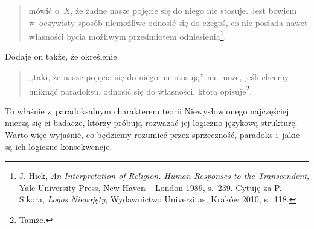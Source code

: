 \begin{quote}
mówić o~$X$, że żadne nasze pojęcie się do niego nie stosuje. Jest bowiem w~oczywisty sposób niemożliwe odnosić się do czegoś, co nie posiada nawet własności bycia możliwym przedmiotem odniesienia\footnote{J. Hick, \textit{An Interpretation of Religion. Human Responses to the Transcendent}, Yale University Press, New Haven -- London 1989, s.~239. Cytuję za P. Sikora, \textit{Logos Niepojęty}, Wydawnictwo Universitas, Kraków 2010, s.~118.}.

\end{quote}
Dodaje on także, że określenie

\begin{quote}
,,taki, że nasze pojęcia się do niego nie stosują'' nie może, jeśli chcemy uniknąć paradoksu, odnosić się do własności, którą opisuje\footnote{Tamże.}.
\end{quote}

To właśnie z~paradoksalnym charakterem teorii Niewysłowionego najczęściej mierzą się ci badacze, którzy próbują rozważać jej logiczno-językową strukturę. Warto więc wyjaśnić, co będziemy rozumieć przez sprzeczność, paradoks i~jakie są ich logiczne konsekwencje.

